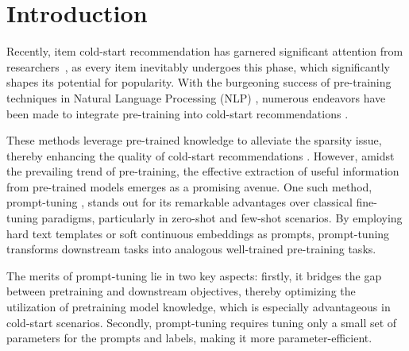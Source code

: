 \documentclass[sigconf]{acmart}
\begin{document}



\maketitle

\section{Introduction}
Recently, item cold-start recommendation has garnered significant attention from researchers~\cite{liu2023uncertainty,cao2023multi}, as every item inevitably undergoes this phase, which significantly shapes its potential for popularity.
With the burgeoning success of pre-training techniques in Natural Language Processing (NLP) \cite{min2023recent}, numerous endeavors have been made to integrate pre-training into cold-start recommendations \cite{hao2023multi,hao2021pre}.

These methods leverage pre-trained knowledge to alleviate the sparsity issue, thereby enhancing the quality of cold-start recommendations \cite{xiao2021uprec}. 
However, amidst the prevailing trend of pre-training, the effective extraction of useful information from pre-trained models emerges as a promising avenue. 
One such method, prompt-tuning \cite{liu2022p,lester2021power}, stands out for its remarkable advantages over classical fine-tuning paradigms, particularly in zero-shot and few-shot scenarios. 
By employing hard text templates or soft continuous embeddings as prompts, prompt-tuning transforms downstream tasks into analogous well-trained pre-training tasks.

The merits of prompt-tuning lie in two key aspects: firstly, it bridges the gap between pretraining and downstream objectives, thereby optimizing the utilization of pretraining model knowledge, which is especially advantageous in cold-start scenarios. 
Secondly, prompt-tuning requires tuning only a small set of parameters for the prompts and labels, making it more parameter-efficient.
\end{document}
